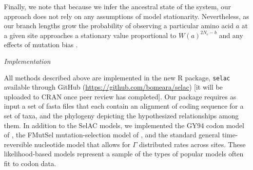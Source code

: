 \documentclass[12pt,letterpaper,fleqn]{article}
\renewcommand{\subsection}[1]{%
\bigskip
\begin{center}
\begin{large}
\normalfont\itshape #1
\end{large}
\end{center}}
\newcommand{\Ne}{\ensuremath{{N_e}}\xspace} %
\begin{document}
Finally, we note that because we infer the ancestral state of the system, our approach does not rely on any assumptions of model stationarity.
Nevertheless, as our branch lengths grow the probability of observing a particular amino acid $a$ at a given site approaches a stationary value proportional to $W(a)^{2 \Ne -b}$ and any effects of mutation bias \citep{SellaAndHirsh2005}.

\subsection{Implementation}\label{sec:implementation}
All methods described above are implemented in the new R package, \texttt{selac} available through GitHub (\url{https://github.com/bomeara/selac}) [it will be uploaded to CRAN once peer review has completed].
Our package requires as input a set of fasta files that each contain an alignment of coding sequence for a set of taxa, and the phylogeny depicting the hypothesized relationships among them.
In addition to the SelAC models, we implemented the GY94 codon model of \citet{GoldmanAndYang1994}, the FMutSel mutation-selection model of \citet{YangAndNielsen2008}, and the standard general time-reversible nucleotide model that allows for $\Gamma$ distributed rates across sites.
These likelihood-based models represent a sample of the types of popular models often fit to codon data.
\end{document}

